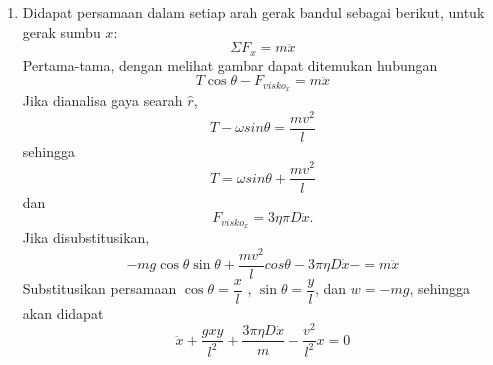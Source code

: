\documentclass[12pt]{article}
\begin{document}
	\begin{enumerate}[label=(\alph*)]
		\item
		 Didapat persamaan dalam setiap arah gerak bandul sebagai berikut, untuk gerak  sumbu $x$:
		\begin{equation}
		\Sigma F_x = m \ddot{x}
		\end{equation}
		Pertama-tama, dengan melihat gambar dapat ditemukan hubungan
		\begin{equation}
		T \cos \theta -F_{visko_x}= m \ddot{x}
		\end{equation}
		Jika dianalisa gaya searah $\hat{r}$,
		\begin{equation}
		T -\omega sin  \theta= \dfrac{mv^2}{l}
		\end{equation}
		sehingga
		\begin{equation}
		T =\omega sin  \theta + \dfrac{mv^2}{l}
		\end{equation}
		dan
		\begin{equation}
		F_{visko_x}= 3\eta\pi D\ddot{x}.
		\end{equation}
		Jika disubstitusikan,
		\begin{equation}
		-mg \cos\theta \sin\theta+\dfrac{mv^2}{l}cos\theta - 3\pi\eta D \dot{x} -  =m \ddot{x}
		\end{equation}
		Substitusikan persamaan $\cos \theta =\dfrac{x}{l} $ , $\sin \theta =\dfrac{y}{l} $, dan $ w =-mg$, sehingga akan didapat
		\begin{equation}
		\ddot{x} +\dfrac{gxy}{l^2} + \dfrac{3\pi\eta D \dot{x}}{m} -\dfrac{v^2}{l^2}x =0 
		\end{equation} \\
		

\end{enumerate}
\end{document}
